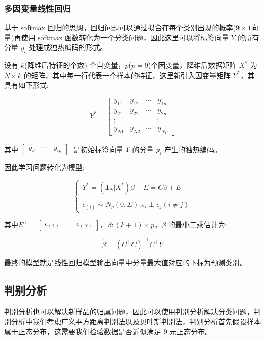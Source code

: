 \documentclass[fleqn]{Paquetes/RevDigMatEduInt}
\begin{document}
\subsubsection{多因变量线性回归}

基于 softmax 回归的思想，回归问题可以通过拟合在每个类别出现的概率($9\times 1$向量)再使用 softmax 函数转化为一个分类问题，因此这里可以将标签向量 $Y$ 的所有分量 $y_i$ 处理成独热编码的形式。

设有 $k$(降维后特征的个数) 个自变量，$p$($p = 9$)个因变量，降维后数据矩阵 $X^*$ 为 $N\times k$ 的矩阵，其中每一行代表一个样本的特征，这里新引入因变量矩阵 $Y^*$，其具有如下形式:

$$
Y^* = \begin{bmatrix}
	y_{11} & y_{12}&\cdots &y_{1p}\\
	y_{21} & y_{22} & \cdots &y_{2p}\\
	\vdots & & &\vdots\\
	y_{N1} & y_{N2} & \cdots &y_{Np}
\end{bmatrix}
$$

其中 $\begin{bmatrix}
	y_{i1}&\cdots&y_{ip}
\end{bmatrix}^\top$是初始标签向量 $Y$ 的分量 $y_i$ 产生的独热编码。

因此学习问题转化为模型:

$$
\begin{cases}
	Y^* = (\mathbf{1}_N | X^*) \beta + E = C\beta + E\\\\
	\epsilon_{(i)} \sim N_p(0,\Sigma), \epsilon_i \perp \epsilon_j (i \ne j)
\end{cases}
$$

其中$E^\top = \begin{bmatrix}
	\epsilon_{(1)} & \cdots& \epsilon_{(N)} 
\end{bmatrix}$，$\beta:(k + 1) \times p$，$\beta$ 的最小二乘估计为:

\begin{teorema}
$$\hat{\beta} = (C^\top C)^{-1} C^\top Y$$
\end{teorema}

最终的模型就是线性回归模型输出向量中分量最大值对应的下标为预测类别。

\subsection{判别分析}
判别分析也可以解决新样品的归属问题，因此可以使用判别分析解决分类问题，判别分析中我们考虑广义平方距离判别法以及贝叶斯判别法，判别分析首先假设样本属于正态分布，这需要我们检验数据是否近似满足 $9$ 元正态分布。
\end{document}
